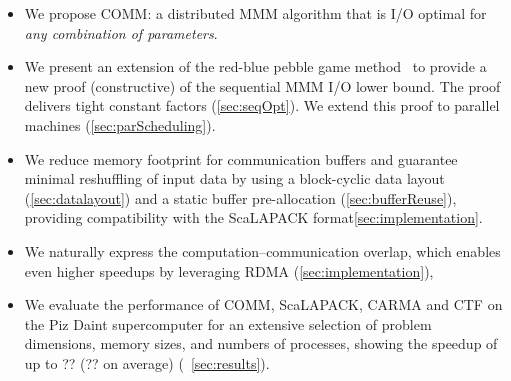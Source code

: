 \documentclass[sigplan,review,anonymous,10pt]{acmart}\settopmatter{printfolios=true,printccs=false,printacmref=false}
\newcommand\mac[1]{\textcolor{red}{[Mac: #1]}}
\begin{document}
\begin{itemize}[leftmargin=1em]
%
\item We propose COMM: a distributed MMM algorithm that is I/O optimal for 
\emph{any combination of parameters}. 
%
%
\item  We present an extension of the red-blue pebble game 
method~\cite{redblue} to provide a new proof (constructive) of
the sequential MMM I/O lower bound.  The proof delivers tight
constant factors (\cref{sec:seqOpt}). We extend this proof to parallel machines 
(\cref{sec:parScheduling}).
%
%
\item We reduce memory footprint for communication buffers and guarantee
minimal reshuffling of input data by using a block-cyclic data layout
(\cref{sec:datalayout}) and a static buffer pre-allocation
(\cref{sec:bufferReuse}), providing compatibility with the
ScaLAPACK format\cref{sec:implementation}.
%
\item We naturally express the computation--communication overlap, which enables
even higher speedups by leveraging RDMA (\cref{sec:implementation}),
%
\item We evaluate the performance of COMM, ScaLAPACK, CARMA and CTF on the Piz 
Daint supercomputer for an
extensive selection of problem dimensions, memory sizes, and numbers of
processes, showing the speedup of up to ?? (?? on average) 
(~\cref{sec:results}).
%
\end{itemize}

%
\end{document}
